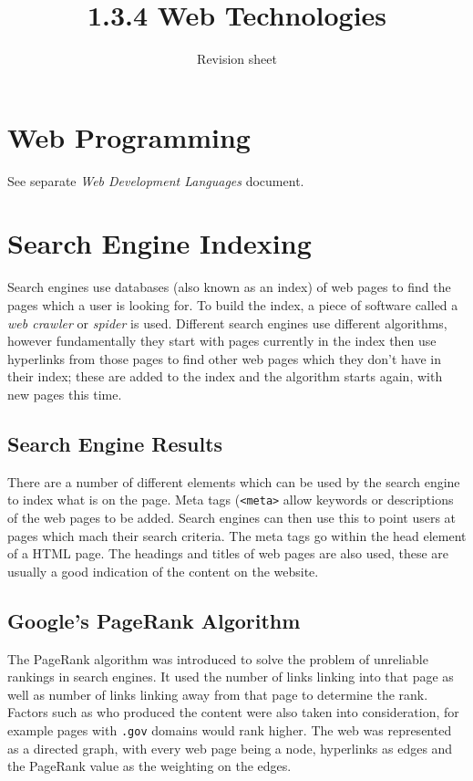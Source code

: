 \documentclass[a4paper,11pt]{article}
\title{1.3.4 Web Technologies}
\author{Revision sheet}
\date{}
\begin{document}
\maketitle
\thispagestyle{fancy}

\begin{multicols}{2}
\section{Web Programming}
See separate \textit{Web Development Languages} document.

\section{Search Engine Indexing}
Search engines use databases (also known as an index) of web pages to find the pages which a user is looking for. To build the index, a piece of software called a \textit{web crawler} or \textit{spider} is used. Different search engines use different algorithms, however fundamentally they start with pages currently in the index then use hyperlinks from those pages to find other web pages which they don't have in their index; these are added to the index and the algorithm starts again, with new pages this time. 
\subsection{Search Engine Results}
There are a number of different elements which can be used by the search engine to index what is on the page. Meta tags (\verb|<meta>| allow keywords or descriptions of the web pages to be added. Search engines can then use this to point users at pages which mach their search criteria. The meta tags go within the head element of a HTML page. The headings and titles of web pages are also used, these are usually a good indication of the content on the website. 
\subsection{Google's PageRank Algorithm}
The PageRank algorithm was introduced to solve the problem of unreliable rankings in search engines. It used the number of links linking into that page as well as number of links linking away from that page to determine the rank. Factors such as who produced the content were also taken into consideration, for example pages with \verb|.gov| domains would rank higher. The web was represented as a directed graph, with every web page being a node, hyperlinks as edges and the PageRank value as the weighting on the edges.


\end{multicols}
\end{document}

